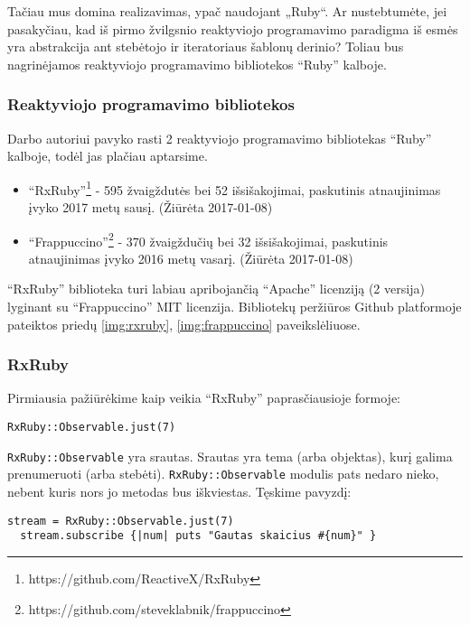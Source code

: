 Tačiau mus domina realizavimas, ypač naudojant „Ruby“. Ar nustebtumėte, jei pasakyčiau, kad iš pirmo žvilgsnio reaktyviojo programavimo paradigma iš esmės yra abstrakcija ant stebėtojo ir iteratoriaus šablonų derinio? Toliau bus nagrinėjamos reaktyviojo programavimo bibliotekos ``Ruby'' kalboje.

\subsubsection{Reaktyviojo programavimo bibliotekos}

Darbo autoriui pavyko rasti 2 reaktyviojo programavimo bibliotekas ``Ruby'' kalboje, todėl jas plačiau aptarsime.

\begin{itemize}
  \item ``RxRuby''\footnote{https://github.com/ReactiveX/RxRuby} - 595 žvaigždutės bei 52 išsišakojimai, paskutinis atnaujinimas įvyko 2017 metų sausį. (Žiūrėta 2017-01-08)

  \item ``Frappuccino''\footnote{https://github.com/steveklabnik/frappuccino} - 370 žvaigždučių bei 32 išsišakojimai, paskutinis atnaujinimas įvyko 2016 metų vasarį. (Žiūrėta 2017-01-08)
\end{itemize}

``RxRuby'' biblioteka turi labiau apribojančią ``Apache'' licenziją (2 versija) lyginant su ``Frappuccino'' MIT licenzija. Bibliotekų peržiūros Github platformoje pateiktos priedų \ref{img:rxruby}, \ref{img:frappuccino} paveikslėliuose.

\subsubsection{RxRuby}

Pirmiausia pažiūrėkime kaip veikia ``RxRuby'' paprasčiausioje formoje:

\begin{lstlisting}[]
  RxRuby::Observable.just(7)
\end{lstlisting}

\lstinline|RxRuby::Observable| yra srautas. Srautas yra tema (arba objektas), kurį galima prenumeruoti (arba stebėti). \lstinline|RxRuby::Observable| modulis pats nedaro nieko, nebent kuris nors jo metodas bus iškviestas. Tęskime pavyzdį:

\begin{lstlisting}[]
  stream = RxRuby::Observable.just(7)
  stream.subscribe {|num| puts "Gautas skaicius #{num}" }
\end{lstlisting}

